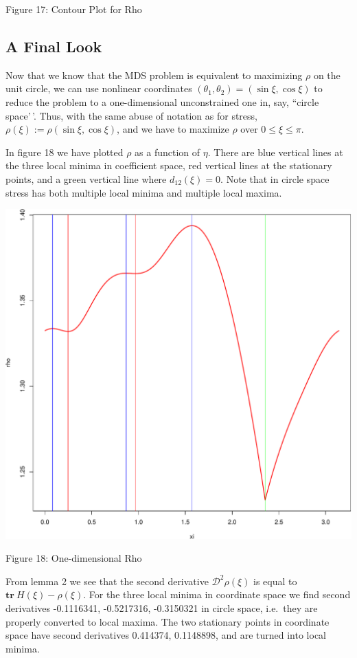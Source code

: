 \documentclass[
  12pt,
]{article}
\begin{document}
Figure 17: Contour Plot for Rho

\subsection{A Final Look}\label{a-final-look}

Now that we know that the MDS problem is equivalent to maximizing \(\rho\) on the unit circle, we can use nonlinear coordinates \((\theta_1,\theta_2)=(\sin\xi,\cos\xi)\) to reduce the problem to a one-dimensional unconstrained one in, say, ``circle space'\,'. Thus, with the same abuse of notation as for stress, \(\rho(\xi):=\rho(\sin\xi,\cos\xi)\), and we have to maximize \(\rho\) over \(0\leq\xi\leq\pi\).

In figure 18 we have plotted \(\rho\) as a function of \(\eta\). There are blue vertical lines at the three local minima in coefficient space,
red vertical lines at the stationary points, and a green vertical line where \(d_{12}(\xi)=0\). Note that in circle space stress has both multiple local minima and multiple local maxima.

\begin{center}\includegraphics{twoPoints_files/figure-latex/rho_nonlinear_plot-1} \end{center}

Figure 18: One-dimensional Rho

From lemma 2 we see that the second derivative \(\mathcal{D}^2\rho(\xi)\) is equal to \(\mathbf{tr}\ H(\xi)-\rho(\xi)\).
For the three local minima in coordinate space we find second derivatives -0.1116341, -0.5217316, -0.3150321 in circle space, i.e.~they are properly converted to local maxima. The two stationary points in coordinate space have second derivatives 0.414374, 0.1148898, and are turned into local minima.
\end{document}
